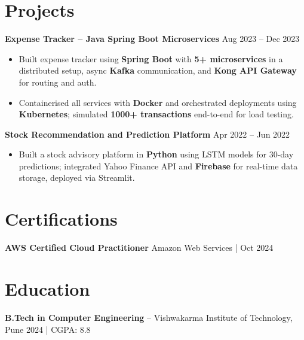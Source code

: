 \documentclass[a4paper,10pt]{article}
\begin{document}
\section*{Projects}

\textbf{Expense Tracker -- Java Spring Boot Microservices} \hfill Aug 2023 -- Dec 2023
\begin{itemize}[leftmargin=*]
    \item Built expense tracker using \textbf{Spring Boot} with \textbf{5+ microservices} in a distributed setup, async \textbf{Kafka} communication, and \textbf{Kong API Gateway} for routing and auth.
    \item Containerised all services with \textbf{Docker} and orchestrated deployments using \textbf{Kubernetes}; simulated \textbf{1000+ transactions} end-to-end for load testing.
\end{itemize}

\textbf{Stock Recommendation and Prediction Platform} \hfill Apr 2022 -- Jun 2022
\begin{itemize}[leftmargin=*]
    \item Built a stock advisory platform in \textbf{Python} using LSTM models for 30-day predictions; integrated Yahoo Finance API and \textbf{Firebase} for real-time data storage, deployed via Streamlit.
\end{itemize}

\section*{Certifications}
\textbf{AWS Certified Cloud Practitioner} \hfill Amazon Web Services \;|\; Oct 2024

\section*{Education}
\textbf{B.Tech in Computer Engineering} -- Vishwakarma Institute of Technology, Pune \hfill 2024 \;|\; CGPA: 8.8
\end{document}
